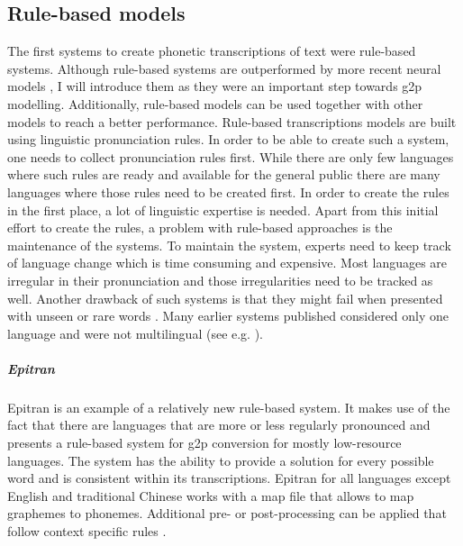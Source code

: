 \subsection{Rule-based models}
The first systems to create phonetic transcriptions of text were rule-based systems. Although rule-based systems are outperformed by more recent neural models \citep{Ashby&Bartley.2021, gorman-etal-2020-sigmorphon}, I will introduce them as they were an important step towards \ac{g2p} modelling. Additionally, rule-based models can be used together with other models to reach a better performance. Rule-based transcriptions models are built using linguistic pronunciation rules. In order to be able to create such a system, one needs to collect pronunciation rules first. While there are only few languages where such rules are ready and available for the general public there are many languages where those rules need to be created first. In order to create the rules in the first place, a lot of linguistic expertise is needed. Apart from this initial effort to create the rules, a problem with rule-based approaches is the maintenance of the systems. To maintain the system, experts need to keep track of language change which is time consuming and expensive. Most languages are irregular in their pronunciation and those irregularities need to be tracked as well. Another drawback of such systems is that they might fail when presented with unseen or rare words \citep{ney-joint-sequence2008}. Many earlier systems published considered only one language and were not multilingual (see e.g. \citet{rule-based2009}). 

\subparagraph{Epitran} Epitran is an example of a relatively new rule-based system. It makes use of the fact that there are languages that are more or less regularly pronounced and presents a rule-based system for \ac{g2p} conversion for mostly low-resource languages. The system has the ability to provide a solution for every possible word and is consistent within its transcriptions. Epitran for all languages except English and traditional Chinese works with a map file that allows to map graphemes to phonemes. Additional pre- or post-processing can be applied that follow context specific rules \citep{mortensen-etal-2018-epitran}.



